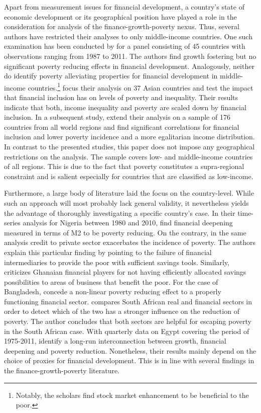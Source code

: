 \documentclass[12pt, a4paper]{article}
\begin{document}
Apart from measurement issues for financial development, a country's state of economic development or its geographical position have played a role in the consideration for analysis of the finance-growth-poverty nexus. Thus, several authors have restricted their analyses to only middle-income countries. One such examination has been conducted by  for a panel consisting of 45 countries with observations ranging from 1987 to 2011. The authors find growth fostering but no significant poverty reducing effects in financial development. Analogously, neither do  identify poverty alleviating properties for financial development in middle-income countries.\footnote{Notably, the scholars find stock market enhancement to be beneficial to the poor.}  focus their analysis on 37 Asian countries and test the impact that financial inclusion has on levels of poverty and inequality. Their results indicate that both, income inequality and poverty are scaled down by financial inclusion. In a subsequent study,  extend their analysis on a sample of 176 countries from all world regions and find significant correlations for financial inclusion and lower poverty incidence and a more egalitarian income distribution. In contrast to the presented studies, this paper does not impose any geographical restrictions on the analysis. The sample covers low- and middle-income countries of all regions. This is due to the fact that poverty constitutes a supra-regional constraint and is salient especially for countries that are classified as low-income.

Furthermore, a large body of literature laid the focus on the country-level. While such an approach will most probably lack general validity, it nevertheless yields the advantage of thoroughly investigating a specific country's case. In their time-series analysis for Nigeria between 1980 and 2010,  find financial deepening measured in terms of M2 to be poverty reducing. On the contrary, in the same analysis credit to private sector exacerbates the incidence of poverty. The authors explain this particular finding by pointing to the failure of financial intermediaries to provide the poor with sufficient savings tools. Similarly,  criticizes Ghanaian financial players for not having efficiently allocated savings possibilities to areas of business that benefit the poor. For the case of Bangladesh,  concede a non-linear poverty reducing effect to a properly functioning financial sector.  compares South African real and financial sectors in order to detect which of the two has a stronger influence on the reduction of poverty. The author concludes that both sectors are helpful for escaping poverty in the South African case. With quarterly data on Egypt covering the period of 1975-2011,  identify a long-run interconnection between growth, financial deepening and poverty reduction. Nonetheless, their results mainly depend on the choice of proxies for financial development. This is in line with several findings in the finance-growth-poverty literature.
\end{document}
